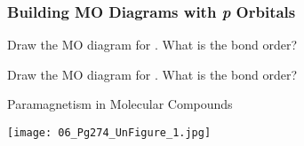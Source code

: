\documentclass[handout]{beamer}
\begin{document}
\begin{frame}[t,allowframebreaks]
	\frametitle{Building MO Diagrams with \textit{p} Orbitals}
	Draw the MO diagram for . What is the bond order?

	\framebreak

	Draw the MO diagram for . What is the bond order?

\end{frame}

\begin{frame}{Paramagnetism in Molecular Compounds}
	\begin{center}
		\texttt{[image: 06\_Pg274\_UnFigure\_1.jpg]}
	\end{center}
\end{frame}

\end{document}
